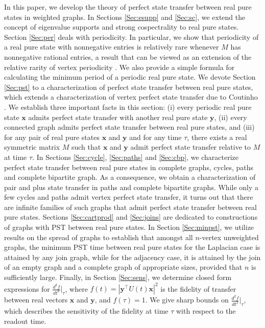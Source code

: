 \documentclass[11pt]{article}
\newcommand{\bx}{\mathbf x}
\newcommand{\by}{\mathbf y}
\begin{document}
In this paper, we develop the theory of perfect state transfer between real pure states in weighted graphs. In Sections \ref{Sec:esupp} and \ref{Sec:sc}, we extend the concept of eigenvalue supports and strong cospectrality to real pure states. Section \ref{Sec:per} deals with periodicity. In particular, we show that periodicity of a real pure state with nonnegative entries is relatively rare whenever $M$ has nonnegative rational entries, a result that can be viewed as an extension of the relative rarity of vertex periodicity \cite{godsil2010can}. We also provide a simple formula for calculating the minimum period of a periodic real pure state. We devote Section \ref{Sec:pst} to a characterization of perfect state transfer between real pure states, which extends a characterization of vertex perfect state transfer due to Coutinho \cite{Coutinho2014}. We establish three important facts in this section: (i) every periodic real pure state $\bx$ admits perfect state transfer with another real pure state $\by$, (ii) every connected graph admits perfect state transfer between real pure states, and (iii) for any pair of real pure states $\bx$ and $\by$ and for any time $\tau$, there exists a real symmetric matrix $M$ such that $\bx$ and $\by$ admit perfect state transfer relative to $M$ at time $\tau$. In Sections \ref{Sec:cycle}, \ref{Sec:paths} and \ref{Sec:cbp}, we characterize perfect state transfer between real pure states in complete graphs, cycles, paths and complete bipartite graph. As a consequence, we obtain a characterization of pair and plus state transfer in paths and complete bipartite graphs. While only a few cycles and paths admit vertex perfect state transfer, it turns out that there are infinite families of such graphs that admit perfect state transfer between real pure states. Sections \ref{Sec:cartprod} and \ref{Sec:joins} are dedicated to constructions of graphs with PST between real pure states. In Section \ref{Sec:minpst}, we utilize results on the spread of graphs to establish that amongst all $n$-vertex unweighted graphs, the minimum PST time between real pure states for the Laplacian case is attained by any join graph, while for the adjacency case, it is attained by the join of an empty graph and a complete graph of appropriate sizes, provided that $n$ is sufficiently large. Finally, in Section \ref{Sec:sens}, we determine closed form expressions for $\frac{d^kf}{dt^k}\rvert_{\tau}$, where $f(t)=|\by^\top U(t)\bx|^2$ is the fidelity of transfer between real vectors $\bx$ and $\by$, and $f(\tau)=1$. We give sharp bounds on $\frac{d^2f}{dt^2}\rvert_{\tau}$, which describes the sensitivity of the fidelity at time $\tau$ with respect to the readout time.
\end{document}
